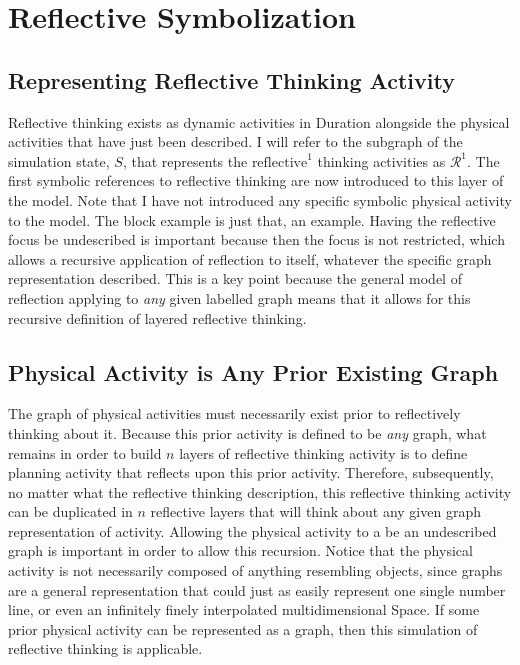 \chapter{Reflective Symbolization}
\label{chapter:reflective_symbolization}

\section{Representing Reflective Thinking Activity}

Reflective thinking exists as dynamic activities in Duration alongside
the physical activities that have just been described.  I will refer
to the subgraph of the simulation state, $S$, that represents the
$\text{reflective}^1$ thinking activities as $\mathcal{R}^1$.  The
first symbolic references to reflective thinking are now introduced to
this layer of the model.  Note that I have not introduced any specific
symbolic physical activity to the model.  The block example is just
that, an example.  Having the reflective focus be undescribed is
important because then the focus is not restricted, which allows a
recursive application of reflection to itself, whatever the specific
graph representation described.  This is a key point because the
general model of reflection applying to \emph{any} given labelled
graph means that it allows for this recursive definition of layered
reflective thinking.

\section{Physical Activity is Any Prior Existing Graph}

The graph of physical activities must necessarily exist prior to
reflectively thinking about it.  Because this prior activity is
defined to be \emph{any} graph, what remains in order to build $n$
layers of reflective thinking activity is to define planning activity
that reflects upon this prior activity.  Therefore, subsequently, no
matter what the reflective thinking description, this reflective
thinking activity can be duplicated in $n$ reflective layers that will
think about any given graph representation of activity.  Allowing the
physical activity to a be an undescribed graph is important in order
to allow this recursion.  Notice that the physical activity is not
necessarily composed of anything resembling objects, since graphs are
a general representation that could just as easily represent one
single number line, or even an infinitely finely interpolated
multidimensional Space.  If some prior physical activity can be
represented as a graph, then this simulation of reflective thinking is
applicable.

